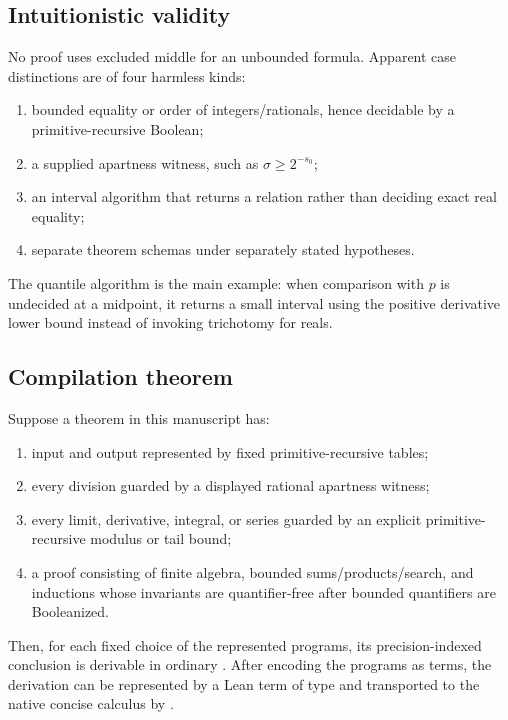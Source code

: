 \subsection{Intuitionistic validity}

No proof uses excluded middle for an unbounded formula.  Apparent case distinctions are of four harmless kinds:
\begin{enumerate}[label=(\roman*)]
  \item bounded equality or order of integers/rationals, hence decidable by a primitive-recursive Boolean;
  \item a supplied apartness witness, such as $\sigma\ge2^{-s_0}$;
  \item an interval algorithm that returns a relation rather than deciding exact real equality;
  \item separate theorem schemas under separately stated hypotheses.
\end{enumerate}
The quantile algorithm is the main example: when comparison with $p$ is undecided at a midpoint, it returns a small interval using the positive derivative lower bound instead of invoking trichotomy for reals.

\subsection{Compilation theorem}

\begin{theorem}\label{thm:compilation}
Suppose a theorem in this manuscript has:
\begin{enumerate}[label=(\roman*)]
  \item input and output represented by fixed primitive-recursive tables;
  \item every division guarded by a displayed rational apartness witness;
  \item every limit, derivative, integral, or series guarded by an explicit primitive-recursive modulus or tail bound;
  \item a proof consisting of finite algebra, bounded sums/products/search, and inductions whose invariants are quantifier-free after bounded quantifiers are Booleanized.
\end{enumerate}
Then, for each fixed choice of the represented programs, its precision-indexed conclusion is derivable in ordinary \ipra.  After encoding the programs as  terms, the derivation can be represented by a Lean term of type \code{[] $\vdash$[PRAAx] $\varphi$} and transported to the native concise calculus by .
\end{theorem}

